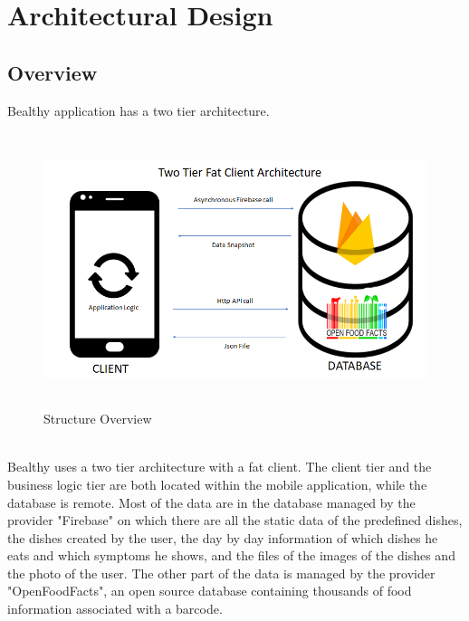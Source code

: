 \documentclass [12pt]{article}
\begin{document}
\section{Architectural Design}
\subsection{Overview}
Bealthy application has a two tier architecture.
\begin{figure}[ht!]
\centering
\includegraphics[height=8cm, width=15cm]{ArchitectureTwoTier.png}
\caption{Structure Overview} 
\end{figure}
\\
Bealthy uses a two tier architecture with a fat client. The client tier and the business logic tier are both located within the mobile application, while the database is remote. Most of the data are in the database managed by the provider "Firebase" on which there are all the static data of the predefined dishes, the dishes created by the user, the day by day information of which dishes he eats and which symptoms he shows, and the files of the images of the dishes and the photo of the user. The other part of the data is managed by the provider "OpenFoodFacts", an open source database containing thousands of food information associated with a barcode.
\end{document}
